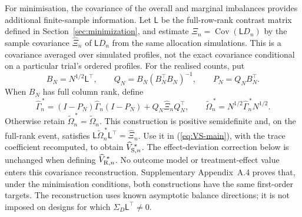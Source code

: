 \documentclass[12pt,a4paper]{article}
\theoremstyle{definition}
\newcommand{\Cov}{\operatorname{Cov}}
\begin{document}
For minimisation, the covariance of the overall and marginal imbalances provides additional finite-sample information. Let $\mathsf L$ be the full-row-rank contrast matrix defined in Section~\ref{sec:minimization}, and estimate $\Xi_n=\Cov(\mathsf L D_n)$ by the sample covariance $\widehat\Xi_n$ of $\mathsf L D_n$ from the same allocation simulations. This is a covariance averaged over simulated profiles, not the exact covariance conditional on a particular trial's ordered profiles. For the realised counts, put
\[
 B_N=N^{1/2}\mathsf L^\top,\qquad
 Q_N=B_N(B_N^\top B_N)^{-1},\qquad P_N=Q_NB_N^\top.
\]
When $B_N$ has full column rank, define
\[
 \widehat\Gamma_n^{\,*}
 =(I-P_N)\widehat\Gamma_n(I-P_N)+Q_N\widehat\Xi_nQ_N^\top,
 \qquad
 \widetilde\Omega_n^{\,*}=N^{1/2}\widehat\Gamma_n^{\,*}N^{1/2}.
\]
Otherwise retain $\widetilde\Omega_n^{\,*}=\widetilde\Omega_n$. This construction is positive semidefinite and, on the full-rank event, satisfies $\mathsf L\widetilde\Omega_n^{\,*}\mathsf L^\top=\widehat\Xi_n$. Use it in (\ref{eq:VS-main}), with the trace coefficient recomputed, to obtain $\widehat V_{{\rm S},n}^{\,*}$. The effect-deviation correction below is unchanged when defining $\widehat V_{{\rm R},n}^{\,*}$. No outcome model or treatment-effect value enters this covariance reconstruction. Supplementary Appendix~A.4 proves that, under the minimisation conditions, both constructions have the same first-order targets. The reconstruction uses known asymptotic balance directions; it is not imposed on designs for which $\Sigma_D\mathsf L^\top\ne0$.
\end{document}
